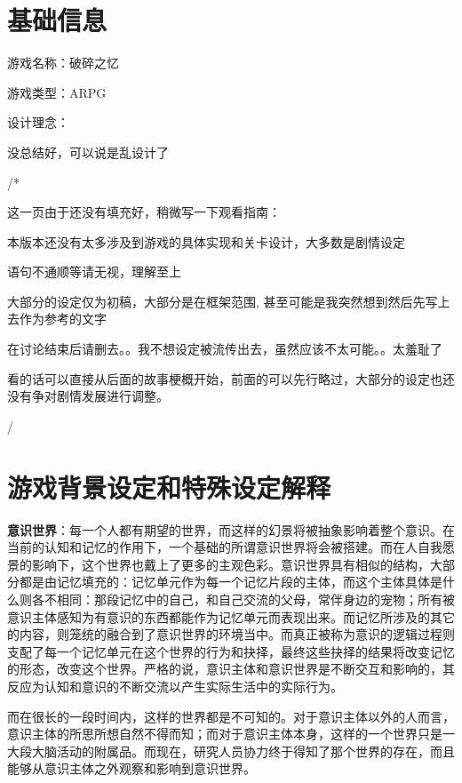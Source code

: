 \documentclass[12pt, a4paper]{article}
\begin{document}
    \section*{基础信息}
    游戏名称：破碎之忆

    游戏类型：ARPG

    设计理念：
    
        \quad 没总结好，可以说是乱设计了

    \noindent /*
   
    这一页由于还没有填充好，稍微写一下观看指南：
        
        本版本还没有太多涉及到游戏的具体实现和关卡设计，大多数是剧情设定

        语句不通顺等请无视，理解至上

        大部分的设定仅为初稿，大部分是在框架范围, 甚至可能是我突然想到然后先写上去作为参考的文字

        在讨论结束后请删去。。我不想设定被流传出去，虽然应该不太可能。。太羞耻了

        看的话可以直接从后面的故事梗概开始，前面的可以先行略过，大部分的设定也还没有争对剧情发展进行调整。

    \noindent */
    \newpage 

    \section*{游戏背景设定和特殊设定解释}
        
        \textbf{意识世界}：每一个人都有期望的世界，而这样的幻景将被抽象影响着整个意识。在当前的认知和记忆的作用下，一个基础的所谓意识世界将会被搭建。而在人自我愿景的影响下，这个世界也戴上了更多的主观色彩。意识世界具有相似的结构，大部分都是由记忆填充的：记忆单元作为每一个记忆片段的主体，而这个主体具体是什么则各不相同：那段记忆中的自己，和自己交流的父母，常伴身边的宠物；所有被意识主体感知为有意识的东西都能作为记忆单元而表现出来。而记忆所涉及的其它的内容，则笼统的融合到了意识世界的环境当中。而真正被称为意识的逻辑过程则支配了每一个记忆单元在这个世界的行为和抉择，最终这些抉择的结果将改变记忆的形态，改变这个世界。严格的说，意识主体和意识世界是不断交互和影响的，其反应为认知和意识的不断交流以产生实际生活中的实际行为。 
        
       而在很长的一段时间内，这样的世界都是不可知的。对于意识主体以外的人而言，意识主体的所思所想自然不得而知；而对于意识主体本身，这样的一个世界只是一大段大脑活动的附属品。而现在，研究人员协力终于得知了那个世界的存在，而且能够从意识主体之外观察和影响到意识世界。 
\end{document}
